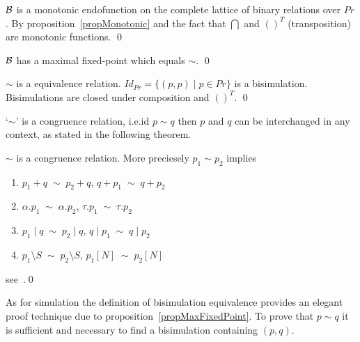 \begin{proposition}
${\cal B}$ is a monotonic endofunction on the complete lattice of binary relations over $Pr$.
\proof By proposition~\ref{propMonotonic} and the fact that $\bigcap$ and $()^T$ (transposition) are monotonic functions.
\qed
\end{proposition}

\begin{proposition}
\label{propMaxFixedPoint}
$\cal B$ has a maximal fixed-point which equals $\sim$.
\qed
\end{proposition}

\begin{proposition}
$\sim$ is a equivalence relation.
\proof $Id_{Pr} = \{(p,p)\mid p\in Pr\}$ is a bisimulation. Bisimulations are closed under composition and $()^T$.
\qed
\end{proposition}

`$\sim$' is a congruence relation, i.e.\@ id $p\sim q$ then $p$ and $q$ can be interchanged in any context, as stated in the following theorem.

\begin{theorem}
$\sim$ is a congruence relation. More preciesely $p_1\sim p_2$ implies
\begin{enumerate}
\item $p_1+q\;\sim\; p_2+q$, $q+p_1\;\sim\; q+p_2$
\item $\alpha.p_1\;\sim\;\alpha.p_2$, $\tau.p_1\;\sim\;\tau.p_2$
\item $p_1\mid q\;\sim\; p_2\mid q$, $q\mid p_1\;\sim\; q\mid p_2$
\item $p_1\setminus S\;\sim\; p_2\setminus S$, $p_1[N]\;\sim\; p_2[N]$
\end{enumerate}
\proof see~\cite{Milner}.\qed
\end{theorem}

As for simulation the definition of bisimulation equivalence provides an elegant proof technique due to proposition~\ref{propMaxFixedPoint}. To prove that $p\sim q$ it is sufficient and necessary to find a bisimulation containing $(p,q)$.

